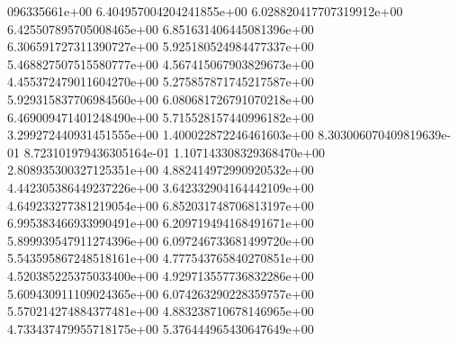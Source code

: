 096335661e+00	6.404957004204241855e+00	6.028820417707319912e+00	6.425507895705008465e+00	6.851631406445081396e+00	6.306591727311390727e+00	5.925180524984477337e+00	5.468827507515580777e+00	4.567415067903829673e+00	4.455372479011604270e+00	5.275857871745217587e+00	5.929315837706984560e+00	6.080681726791070218e+00	6.469009471401248490e+00	5.715528157440996182e+00	3.299272440931451555e+00	1.400022872246461603e+00	8.303006070409819639e-01	8.723101979436305164e-01	1.107143308329368470e+00	2.808935300327125351e+00	4.882414972990920532e+00	4.442305386449237226e+00	3.642332904164442109e+00	4.649233277381219054e+00	6.852031748706813197e+00	6.995383466933990491e+00	6.209719494168491671e+00	5.899939547911274396e+00	6.097246733681499720e+00	5.543595867248518161e+00	4.777543765840270851e+00	4.520385225375033400e+00	4.929713557736832286e+00	5.609430911109024365e+00	6.074263290228359757e+00	5.570214274884377481e+00	4.883238710678146965e+00	4.733437479955718175e+00	5.376444965430647649e+00
